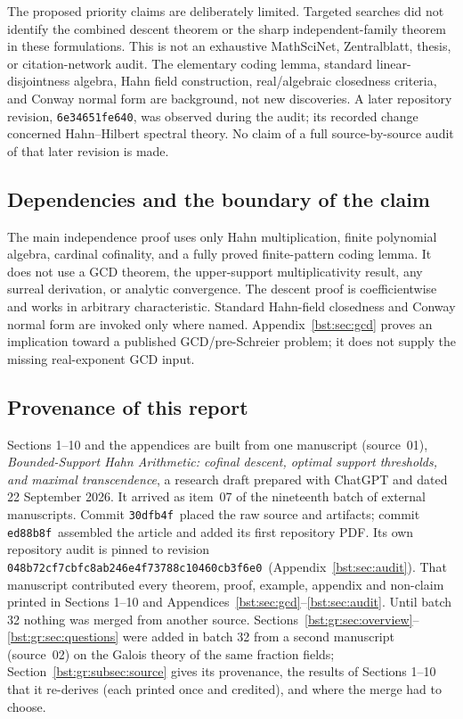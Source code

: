 \documentclass[11pt,letterpaper]{article}
\theoremstyle{definition}
\theoremstyle{remark}
\newcommand{\auditcommit}{\texttt{048b72cf7cbfc8ab246e4f73788c10460cb3f6e0}}
\newcommand{\placecommit}{\texttt{30dfb4f}}
\newcommand{\assemblycommit}{\texttt{ed88b8f}}
\begin{document}
The proposed priority claims are deliberately limited. Targeted searches did
not identify the combined descent theorem or the sharp independent-family
theorem in these formulations. This is not an exhaustive MathSciNet,
Zentralblatt, thesis, or citation-network audit. The elementary coding
lemma, standard linear-disjointness algebra, Hahn field construction,
real/algebraic closedness criteria, and Conway normal form are background,
not new discoveries. A later repository revision, \texttt{6e34651fe640},
was observed during the audit; its recorded change concerned Hahn--Hilbert
spectral theory. No claim of a full source-by-source audit of that later
revision is made.

\subsection{Dependencies and the boundary of the claim}

The main independence proof uses only Hahn multiplication, finite polynomial
algebra, cardinal cofinality, and a fully proved finite-pattern coding
lemma. It does not use a GCD theorem, the upper-support multiplicativity
result, any surreal derivation, or analytic convergence. The descent proof
is coefficientwise and works in arbitrary characteristic. Standard
Hahn-field closedness and Conway normal form are invoked only where named.
Appendix~\ref{bst:sec:gcd} proves an implication toward a published GCD/pre-Schreier
problem; it does not supply the missing real-exponent GCD input.

\subsection{Provenance of this report}\label{bst:subsec:provenance}

Sections 1--10 and the appendices are built from one manuscript
(source~01), \emph{Bounded-Support Hahn
Arithmetic: cofinal descent, optimal support thresholds, and maximal
transcendence}, a research draft prepared with ChatGPT and dated
22 September 2026. It arrived as item~07 of the nineteenth batch of external
manuscripts. Commit \placecommit\ placed the raw source and artifacts;
commit \assemblycommit\ assembled the article and added its first repository
PDF. Its own
repository audit is pinned to revision \auditcommit\ (Appendix~\ref{bst:sec:audit}).
That manuscript contributed every theorem, proof, example, appendix and
non-claim printed in Sections 1--10 and Appendices~\ref{bst:sec:gcd}--\ref{bst:sec:audit}.
Until batch 32 nothing was merged from another source. Sections~\ref{bst:gr:sec:overview}--\ref{bst:gr:sec:questions}
were added in batch 32 from a second manuscript (source~02) on the Galois
theory of the same fraction fields; Section~\ref{bst:gr:subsec:source}
gives its provenance, the results of Sections 1--10 that it re-derives
(each printed once and credited), and where the merge had to choose.
\end{document}
